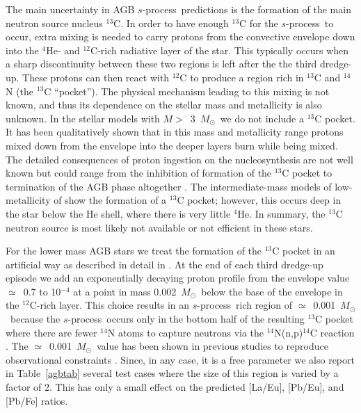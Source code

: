 \documentclass{emulateapj}
\def\spro{\mbox{$s$-process}}
\def\msun{$M_{\odot}$}
\begin{document}
The main uncertainty in AGB \spro\ predictions is the formation 
of the main neutron source nucleus $^{13}$C. 
In order to have enough $^{13}$C for the \spro\ to occur, extra 
mixing is needed to carry protons from the convective envelope down into the 
$^4$He- and $^{12}$C-rich radiative layer of the star.
This typically occurs when a sharp discontinuity between 
these two regions is left after the the third dredge-up. 
These protons can then react with $^{12}$C to produce a region rich in 
$^{13}$C and $^{14}$N (the $^{13}$C ``pocket''). 
The physical mechanism leading to this mixing is not known, and thus 
its dependence on the stellar mass and metallicity is also unknown.
In the stellar models with $M >$~3~\msun\ we do not include a 
$^{13}$C pocket.
It has been qualitatively shown that in this mass and metallicity range
protons mixed down from the envelope
into the deeper layers burn while being mixed. 
The detailed consequences of proton ingestion on the nucleosynthesis 
are not well known
but could range from the inhibition of formation of the 
$^{13}$C pocket \citep{goriely04} 
to termination of the AGB phase altogether \citep{woodward08}. 
The intermediate-mass models of low-metallicity of 
\citet{herwig04} show the formation of a $^{13}$C pocket; however, 
this occurs deep in the star below the He shell, where there 
is very little $^{4}$He. 
In summary, the $^{13}$C neutron source is most likely not 
available or not efficient in these stars. 

For the lower mass AGB stars we treat the formation of the 
$^{13}$C pocket in an artificial way 
as described in detail in \citet{lugaro04}.
At the end of each third dredge-up episode
we add an exponentially decaying proton profile 
from the envelope value $\simeq$~0.7 
to 10$^{-4}$ at a point in mass 0.002~\msun\ 
below the base of the envelope
in the $^{12}$C-rich layer.
This choice results in an \spro\ rich region of $\simeq$~0.001~\msun\ 
because the \spro\ occurs only in the bottom half 
of the resulting $^{13}$C pocket 
where there are fewer $^{14}$N atoms to capture neutrons 
via the $^{14}$N(n,p)$^{14}$C reaction 
\citep{goriely00,lugaro03}. 
The $\simeq$~0.001~\msun\ value has been shown in previous studies 
to reproduce observational constraints 
\citep{busso01,cristallo09a}.
Since, in any case, it is a free parameter we also report in Table~\ref{agbtab}
several test cases where the size of this region is 
varied by a factor of 2.
This has only a small effect on the predicted [La/Eu], [Pb/Eu], 
and [Pb/Fe] ratios.
\end{document}
